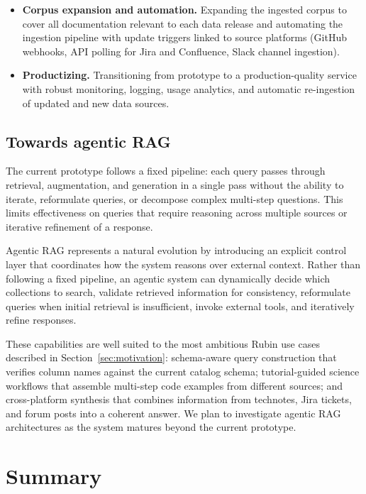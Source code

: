 \begin{itemize}
\item\textbf{Corpus expansion and automation.}
Expanding the ingested corpus to cover all documentation relevant to each data release and automating the ingestion pipeline with update triggers linked to source platforms (GitHub webhooks, API polling for Jira and Confluence, Slack channel ingestion).
 
\item\textbf{Productizing.}
Transitioning from prototype to a production-quality service with robust monitoring, logging, usage analytics, and automatic re-ingestion of updated and new data sources.

\end{itemize}

\subsection{Towards agentic RAG}
\label{sec:agentic_rag}
 
The current prototype follows a fixed pipeline: each query passes through retrieval, augmentation, and generation in a single pass without the ability to iterate, reformulate queries, or decompose complex multi-step questions.
This limits effectiveness on queries that require reasoning across multiple sources or iterative refinement of a response.
 
Agentic \gls{RAG} represents a natural evolution by introducing an explicit control layer that coordinates how the system reasons over external context.
Rather than following a fixed pipeline, an agentic system can dynamically decide which collections to search, validate retrieved information for consistency, reformulate queries when initial retrieval is insufficient, invoke external tools, and iteratively refine responses.
 
These capabilities are well suited to the most ambitious Rubin use cases described in Section~\ref{sec:motivation}: schema-aware query construction that verifies column names against the current catalog schema; tutorial-guided science workflows that assemble multi-step code examples from different sources; and cross-platform synthesis that combines information from technotes, Jira tickets, and forum posts into a coherent answer.
We plan to investigate agentic \gls{RAG} architectures as the system matures beyond the current prototype.

\section{Summary}
\label{sec:summary}
 

